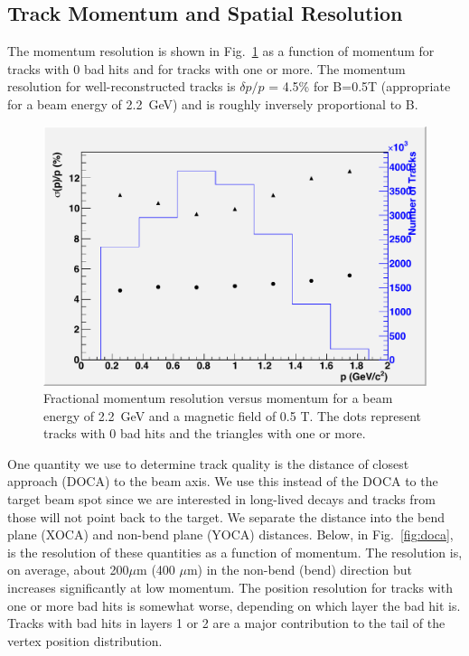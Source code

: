 \subsection{Track Momentum and Spatial Resolution}

The momentum resolution is shown in Fig.~\ref{fig:trkmom} as a function of momentum for tracks with 
0 bad hits and for tracks with one or more.  The momentum resolution for well-reconstructed 
tracks is $\delta p/p$ = 4.5\% for B=0.5T (appropriate for a beam energy of 2.2~GeV) and is roughly inversely proportional to B.  


\begin{figure}
\includegraphics[scale=0.8]{performance/tracking_performance/pz2pt2GeV-MomRes-Tracks.pdf}
\caption{  Fractional momentum resolution versus momentum for a beam energy of 2.2~GeV and a magnetic field of 0.5 T. The dots represent tracks with 0 bad hits and the triangles with one or more.} 
\label{fig:trkmom}
\end{figure}


One quantity we use to determine track quality is the distance of closest approach (DOCA) 
to the beam axis.  We use this instead of the DOCA to the target beam spot since we are 
interested in long-lived decays and tracks from those will not point back to the target. 
We separate the distance into the bend plane (XOCA) and non-bend plane (YOCA) distances.  
Below, in Fig.~\ref{fig:doca}, is the resolution of these quantities as a function of momentum.  
The resolution is, on average, about 200$\mu$m (400 $\mu$m) 
in the non-bend (bend) direction but increases significantly at low momentum.  The position 
resolution for tracks with one or more bad hits is somewhat worse, depending on which layer 
the bad hit is.  Tracks with bad hits in 
layers 1 or 2 are a major contribution to the tail of the vertex position distribution. 
    
